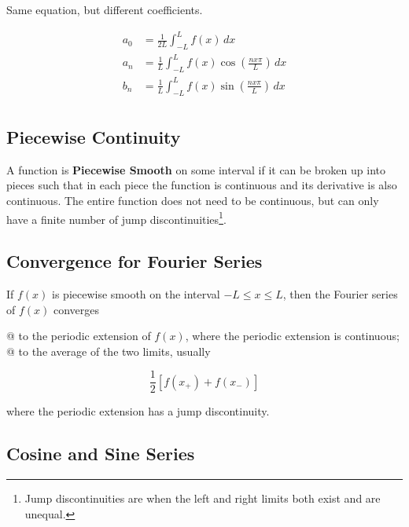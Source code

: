 \begin{thm}
    Same equation, but different coefficients.

    \begin{align*}
        a_0 &= \frac{1}{2L} \int_{-L}^L f(x) \, dx\\
        a_n &= \frac{1}{L} \int_{-L}^L f(x) \cos\left(\frac{nx\pi}{L}\right) \, dx\\
        b_n &= \frac{1}{L} \int_{-L}^L f(x) \sin\left(\frac{nx\pi}{L}\right) \, dx\\
    \end{align*}
\end{thm}

    \subsection{Piecewise Continuity}
    A function is \textbf{Piecewise Smooth} on some interval if it can be broken up into pieces such that in each piece
    the function is continuous and its derivative is also continuous. The entire function does not need to be
    continuous, but can only have a finite number of jump discontinuities\footnote{Jump discontinuities are when the
    left and right limits both exist and are unequal.}.

    \subsection{Convergence for Fourier Series}
    \begin{thm}
        If $f(x)$ is piecewise smooth on the interval $-L \le x \le L$, then the Fourier series of $f(x)$ converges

        \begin{easylist}[enumerate]
            @ to the periodic extension of $f(x)$, where the periodic extension is continuous;
            @ to the average of the two limits, usually

            \[
                \frac{1}{2} [ f(x_+) + f(x_-) ]
            \]

            where the periodic extension has a jump discontinuity.
        \end{easylist}
    \end{thm}

    \subsection{Cosine and Sine Series}


